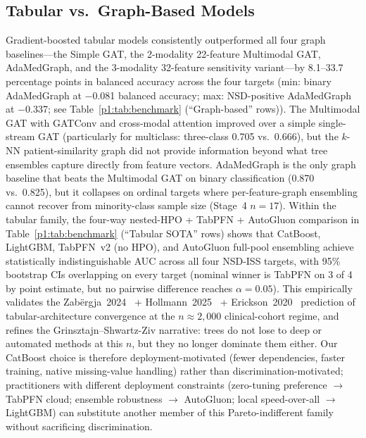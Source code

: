 \subsection{Tabular vs.\ Graph-Based Models}
Gradient-boosted tabular models consistently outperformed all four graph baselines---the Simple GAT, the 2-modality 22-feature Multimodal GAT, AdaMedGraph, and the 3-modality 32-feature sensitivity variant---by 8.1--33.7 percentage points in balanced accuracy across the four targets (min: binary AdaMedGraph at $-$0.081 balanced accuracy; max: NSD-positive AdaMedGraph at $-$0.337; see Table~\ref{p1:tab:benchmark} (``Graph-based'' rows)). The Multimodal GAT with GATConv and cross-modal attention improved over a simple single-stream GAT (particularly for multiclass: three-class 0.705 vs.\ 0.666), but the $k$-NN patient-similarity graph did not provide information beyond what tree ensembles capture directly from feature vectors. AdaMedGraph is the only graph baseline that beats the Multimodal GAT on binary classification (0.870 vs.\ 0.825), but it collapses on ordinal targets where per-feature-graph ensembling cannot recover from minority-class sample size (Stage~4 $n{=}17$). Within the tabular family, the four-way nested-HPO + TabPFN + AutoGluon comparison in Table~\ref{p1:tab:benchmark} (``Tabular SOTA'' rows) shows that CatBoost, LightGBM, TabPFN~v2 (no HPO), and AutoGluon full-pool ensembling achieve statistically indistinguishable AUC across all four NSD-ISS targets, with 95\% bootstrap CIs overlapping on every target (nominal winner is TabPFN on 3 of 4 by point estimate, but no pairwise difference reaches $\alpha{=}0.05$). This empirically validates the Zab\"{e}rgja~2024~\cite{zabergja2024dltabular} + Hollmann~2025~\cite{hollmann2025tabpfn} + Erickson~2020~\cite{erickson2020autogluon} prediction of tabular-architecture convergence at the $n{\approx}2{,}000$ clinical-cohort regime, and refines the Grinsztajn--Shwartz-Ziv narrative: trees do not lose to deep or automated methods at this $n$, but they no longer dominate them either. Our CatBoost choice is therefore deployment-motivated (fewer dependencies, faster training, native missing-value handling) rather than discrimination-motivated; practitioners with different deployment constraints (zero-tuning preference $\to$ TabPFN cloud; ensemble robustness $\to$ AutoGluon; local speed-over-all $\to$ LightGBM) can substitute another member of this Pareto-indifferent family without sacrificing discrimination.

